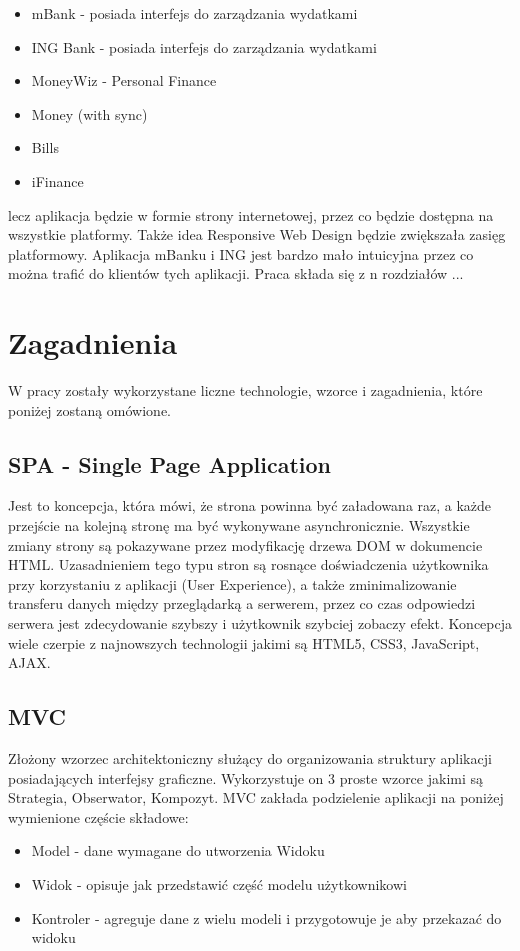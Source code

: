 \documentclass[10pt,titlepage]{article}
\begin{document}
\begin{itemize}
  \item mBank - posiada interfejs do zarządzania wydatkami
  \item ING Bank - posiada interfejs do zarządzania wydatkami
  \item MoneyWiz - Personal Finance
  \item Money (with sync)
  \item Bills
  \item iFinance
\end{itemize}
lecz aplikacja będzie w formie strony internetowej, przez co będzie dostępna na wszystkie platformy. Także idea Responsive Web Design będzie zwiększała zasięg platformowy. Aplikacja mBanku i ING jest bardzo mało intuicyjna przez co można trafić do klientów tych aplikacji. Praca składa się z n rozdziałów ...

\section{Zagadnienia}
W pracy zostały wykorzystane liczne technologie, wzorce i zagadnienia, które poniżej zostaną omówione.
\subsection{SPA - Single Page Application}
Jest to koncepcja, która mówi, że strona powinna być załadowana raz, a każde przejście na kolejną stronę ma być wykonywane asynchronicznie. Wszystkie zmiany strony są pokazywane przez modyfikację drzewa DOM w dokumencie HTML. Uzasadnieniem tego typu stron są rosnące doświadczenia użytkownika przy korzystaniu z aplikacji (User Experience), a także zminimalizowanie transferu danych między przeglądarką a serwerem, przez co czas odpowiedzi serwera jest zdecydowanie szybszy i użytkownik szybciej zobaczy efekt. Koncepcja wiele czerpie z najnowszych technologii jakimi są HTML5, CSS3, JavaScript, AJAX.
\subsection{MVC}
Złożony wzorzec architektoniczny służący do organizowania struktury aplikacji posiadających interfejsy graficzne. Wykorzystuje on 3 proste wzorce jakimi są Strategia, Obserwator, Kompozyt.\linebreak
MVC zakłada podzielenie aplikacji na poniżej wymienione częście składowe:
\begin{itemize}
  \item Model - dane wymagane do utworzenia Widoku
  \item Widok - opisuje jak przedstawić część modelu użytkownikowi
  \item Kontroler - agreguje dane z wielu modeli i przygotowuje je aby przekazać do widoku
\end{itemize}
\end{document}
